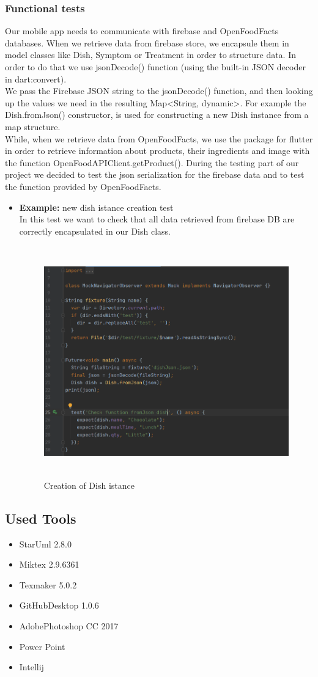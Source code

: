 \documentclass [12pt]{article}
\begin{document}
\subsubsection{Functional tests}
Our mobile app  needs to communicate with firebase and OpenFoodFacts databases. When we retrieve data from firebase store, we encapsule them in model classes like Dish, Symptom or Treatment in order to structure data. In order to do that we use jsonDecode() function (using the built-in JSON decoder in dart:convert).
\\
We pass the Firebase  JSON string  to the jsonDecode() function, and then looking up the values we need in the resulting Map<String, dynamic>. 
For example the Dish.fromJson() constructor, is used for constructing a new Dish instance from a map structure. \\
While, when we retrieve data from OpenFoodFacts, we use the package for flutter in order to  retrieve information about products, their ingredients and image with the function OpenFoodAPIClient.getProduct().
During the testing part of our project we decided to test the json serialization for the firebase data and to test the function provided by OpenFoodFacts.
\begin{itemize}[•]
\item \textbf{Example:} new dish istance creation test\\
In this test we want to check that all data retrieved from firebase DB are correctly encapsulated in our Dish class. 
\begin{figure}[h!]
\centering
\includegraphics[width=\linewidth,height=10cm]{DishCreatedTest.PNG}
\caption{Creation of Dish istance}
\medskip
\small
\end{figure}
\end{itemize}


\subsection{Used Tools}
\begin{itemize}
\item StarUml 2.8.0
\item Miktex 2.9.6361
\item Texmaker 5.0.2
\item GitHubDesktop 1.0.6
\item AdobePhotoshop CC 2017
\item Power Point
\item Intellij
\end{itemize}
\end{document}
